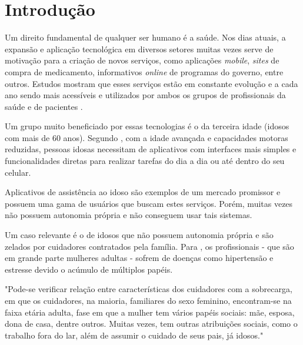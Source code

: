 \documentclass[
	article,			%
	12pt,				%
	oneside,			%
	a4paper,			%
    BIBLATEX,           %
	english,			%
	brazil,				%
	sumario=tradicional
	]{abntex2}
\begin{document}

\textual

\section{Introdução}

Um direito fundamental de qualquer ser humano é a saúde. Nos dias atuais, a expansão e aplicação tecnológica em diversos setores muitas vezes serve de motivação para a criação de novos serviços, como aplicações \textit{mobile}, \textit{sites} de compra de medicamento, informativos \textit{online} de programas do governo, entre outros. Estudos mostram que esses serviços estão em constante evolução e a cada ano sendo mais acessíveis e utilizados por ambos os grupos de profissionais da saúde e de pacientes \cite{clarisse2016}.

Um grupo muito beneficiado por essas tecnologias é o da terceira idade (idosos com mais de 60 anos). Segundo , com a idade avançada e capacidades motoras reduzidas, pessoas idosas necessitam de aplicativos com interfaces mais simples e funcionalidades diretas para realizar tarefas do dia a dia ou até dentro do seu celular.

Aplicativos de assistência ao idoso são exemplos de um mercado promissor e possuem uma gama de usuários que buscam estes serviços. Porém, muitas vezes não possuem autonomia própria e não conseguem usar tais sistemas.

Um caso relevante é o de idosos que não possuem autonomia própria e são zelados por cuidadores contratados pela família. Para , os profissionais - que são em grande parte mulheres adultas - sofrem de doenças como hipertensão e estresse devido o acúmulo de múltiplos papéis.

\begin{citacao}
"Pode-se verificar relação entre características dos cuidadores com a sobrecarga, em que os cuidadores, na maioria, familiares do sexo feminino, encontram-se na faixa etária adulta, fase em que a mulher tem vários papéis sociais: mãe, esposa, dona de casa, dentre outros. Muitas vezes, tem outras atribuições sociais, como o trabalho fora do lar, além de assumir o cuidado de seus pais, já idosos." \cite{aline2012sobrecarga} 
\end{citacao}
\end{document}
